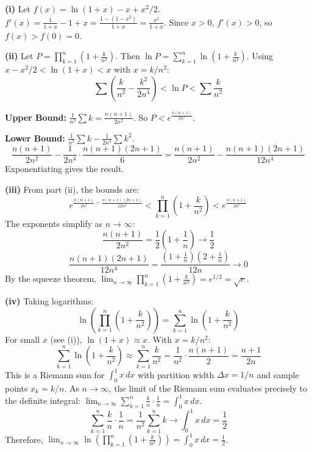 \begin{solution}
\textbf{(i)} Let $f(x) = \ln(1+x) - x + x^2/2$. $f'(x) = \frac{1}{1+x} - 1 + x = \frac{1 - (1-x^2)}{1+x} = \frac{x^2}{1+x}$.
Since $x>0$, $f'(x)>0$, so $f(x) > f(0) = 0$.

\textbf{(ii)} Let $P = \prod_{k=1}^n (1 + \frac{k}{n^2})$. Then $\ln P = \sum_{k=1}^n \ln(1 + \frac{k}{n^2})$.
Using $x - x^2/2 < \ln(1+x) < x$ with $x = k/n^2$:
\[ \sum \left( \frac{k}{n^2} - \frac{k^2}{2n^4} \right) < \ln P < \sum \frac{k}{n^2} \]

\textbf{Upper Bound:} $\frac{1}{n^2} \sum k = \frac{n(n+1)}{2n^2}$. So $P < e^{\frac{n(n+1)}{2n^2}}$.

\textbf{Lower Bound:} $\frac{1}{n^2} \sum k - \frac{1}{2n^4} \sum k^2$.
\[ \frac{n(n+1)}{2n^2} - \frac{1}{2n^4} \cdot \frac{n(n+1)(2n+1)}{6} = \frac{n(n+1)}{2n^2} - \frac{n(n+1)(2n+1)}{12n^4} \]
Exponentiating gives the result.

\textbf{(iii)} From part (ii), the bounds are:
\[ e^{\frac{n(n+1)}{2n^2} - \frac{n(n+1)(2n+1)}{12n^4}} < \prod_{k=1}^n \left( 1 + \frac{k}{n^2} \right) < e^{\frac{n(n+1)}{2n^2}} \]
The exponents simplify as $n \to \infty$:
\[ \frac{n(n+1)}{2n^2} = \frac{1}{2}\left(1 + \frac{1}{n}\right) \to \frac{1}{2} \]
\[ \frac{n(n+1)(2n+1)}{12n^4} = \frac{(1+\frac{1}{n})(2+\frac{1}{n})}{12n} \to 0 \]
By the squeeze theorem, $\displaystyle \lim_{n \to \infty} \prod_{k=1}^{n} \left(1 + \frac{k}{n^2}\right) = e^{1/2} = \sqrt{e}$.

\textbf{(iv)} Taking logarithms:
\[ \ln \left(\prod_{k=1}^{n} \left(1 + \frac{k}{n^2}\right)\right) = \sum_{k=1}^n \ln\left(1 + \frac{k}{n^2}\right) \]
For small $x$ (see (i)), $\ln(1+x) \approx x$. With $x = k/n^2$:
\[ \sum_{k=1}^n \ln\left(1 + \frac{k}{n^2}\right) \approx \sum_{k=1}^n \frac{k}{n^2} = \frac{1}{n^2} \cdot \frac{n(n+1)}{2} = \frac{n+1}{2n} \]
This is a Riemann sum for $\int_0^1 x \, dx$ with partition width $\Delta x = 1/n$ and sample points $x_k = k/n$.
As $n \to \infty$, the limit of the Riemann sum evaluates precisely to the definite integral: $\lim_{n \to \infty} \sum_{k=1}^n \frac{k}{n} \cdot \frac{1}{n} = \int_0^1 x \, dx$.
\[ \sum_{k=1}^n \frac{k}{n} \cdot \frac{1}{n} = \frac{1}{n^2}\sum_{k=1}^n k \to \int_0^1 x \, dx = \frac{1}{2} \]
Therefore, $\displaystyle \lim_{n \to \infty} \ln \left(\prod_{k=1}^{n} \left(1 + \frac{k}{n^2}\right)\right) = \int_{0}^{1} x \, dx = \frac{1}{2}$.
\end{solution}

